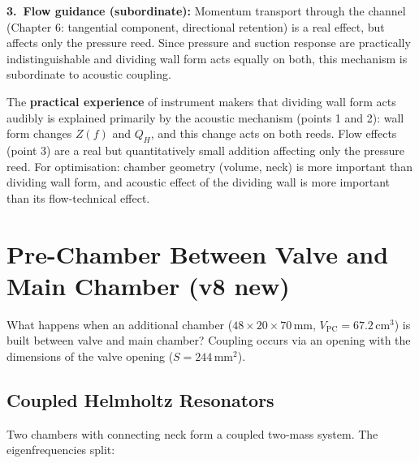 \documentclass[11pt,a4paper]{article}
\begin{document}
\textbf{3.\ Flow guidance (subordinate):} Momentum transport through the channel (Chapter 6: tangential component, directional retention) is a real effect, but affects only the pressure reed. Since pressure and suction response are practically indistinguishable and dividing wall form acts equally on both, this mechanism is subordinate to acoustic coupling.

\begin{keybox}
The \textbf{practical experience} of instrument makers that dividing wall form acts audibly is explained primarily by the acoustic mechanism (points 1 and 2): wall form changes $Z(f)$ and $Q_H$, and this change acts on both reeds. Flow effects (point 3) are a real but quantitatively small addition affecting only the pressure reed. For optimisation: chamber geometry (volume, neck) is more important than dividing wall form, and acoustic effect of the dividing wall is more important than its flow-technical effect.
\end{keybox}

\section{Pre-Chamber Between Valve and Main Chamber (v8 new)}

What happens when an additional chamber ($48 \times 20 \times 70$\,mm, $V_\text{PC} = 67.2$\,cm$^3$) is built between valve and main chamber? Coupling occurs via an opening with the dimensions of the valve opening ($S = 244$\,mm$^2$).

\subsection{Coupled Helmholtz Resonators}

Two chambers with connecting neck form a coupled two-mass system. The eigenfrequencies split:

\begin{table}[H]
\centering\small
{}
\caption{Eigenfrequencies without and with pre-chamber (PC)}
\end{table}
\end{document}
